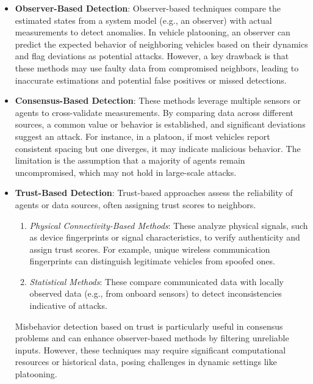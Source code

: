 \documentclass[letterpaper, 10pt, conference]{ieeeconf}  %
\begin{document}
\begin{itemize}
    \item \textbf{Observer-Based Detection}: 
    Observer-based techniques compare the estimated states from a system model (e.g., an observer) with actual measurements to detect anomalies. In vehicle platooning, an observer can predict the expected behavior of neighboring vehicles based on their dynamics and flag deviations as potential attacks. However, a key drawback is that these methods may use faulty data from compromised neighbors, leading to inaccurate estimations and potential false positives or missed detections.

    \item \textbf{Consensus-Based Detection}: 
    These methods leverage multiple sensors or agents to cross-validate measurements. By comparing data across different sources, a common value or behavior is established, and significant deviations suggest an attack. For instance, in a platoon, if most vehicles report consistent spacing but one diverges, it may indicate malicious behavior. The limitation is the assumption that a majority of agents remain uncompromised, which may not hold in large-scale attacks.

    \item \textbf{Trust-Based Detection}: 
    Trust-based approaches assess the reliability of agents or data sources, often assigning trust scores to neighbors.
    \begin{enumerate}
        \item \textit{Physical Connectivity-Based Methods}: These analyze physical signals, such as device fingerprints or signal characteristics, to verify authenticity and assign trust scores. For example, unique wireless communication fingerprints can distinguish legitimate vehicles from spoofed ones.
        \item \textit{Statistical Methods}: These compare communicated data with locally observed data (e.g., from onboard sensors) to detect inconsistencies indicative of attacks. 
    \end{enumerate}
    Misbehavior detection based on trust is particularly useful in consensus problems and can enhance observer-based methods by filtering unreliable inputs. However, these techniques may require significant computational resources or historical data, posing challenges in dynamic settings like platooning.
\end{itemize}
\end{document}
